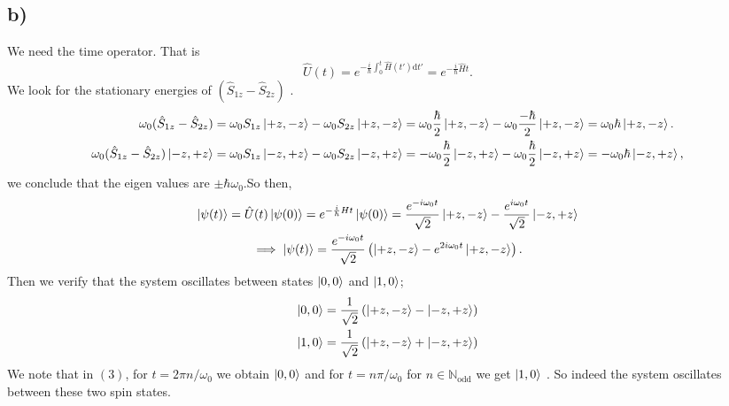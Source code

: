 \documentclass[12pt]{article}
\newcommand{\dr}{\mathrm{d}}
\theoremstyle{definition}
\theoremstyle{definition}
\theoremstyle{definition}
\theoremstyle{definition}
\theoremstyle{definition}
\theoremstyle{example}
\theoremstyle{note}
\theoremstyle{remark}
\theoremstyle{example}
\begin{document}
 				\subsection*{b) }
 					We need the time operator. That is
 					$$ \hat{U}(t) = e^{ - \frac{i}{\hbar} \int_{0}^{t} \hat{H} (t') \dr t' } = e^{-\frac{i}{\hbar} \hat{H} t}.$$
 					We look for the stationary energies of $(\hat{S}_{1z} - \hat{S}_{2z})$ . 
 					\begin{align*}
 						\omega_{0}(\hat{S}_{1z} - \hat{S}_{2z}) &= \omega_{0}S_{1z} \ket{+z, -z} - \omega_{0}S_{2z} \ket{+z, -z} = \omega_{0}\frac{\hbar}{2} \ket{+z, -z} - \omega_{0}\frac{-\hbar}{2} \ket{+z,-z} = \omega_{0}\hbar \ket{+z, -z}. \\
 						\omega_{0} (\hat{S}_{1z} - \hat{S}_{2z}) \ket{-z, +z} &= \omega_{0} S_{1z} \ket{-z,+z} - \omega_{0} S_{2z} \ket{-z,+z} = -\omega_{0} \frac{\hbar}{2} \ket{-z,+z} - \omega_{0 }\frac{\hbar}{2} \ket{-z, +z} = -\omega_{0} \hbar\ket{-z,+z},
 					\end{align*}
 					we conclude that the eigen values are $\pm \hbar \omega_{0}$.So then, 
 					\begin{gather}
 						 \ket{\psi(t)} = \hat{U}(t) \ket{\psi(0)} = e^{- \frac{i}{\hbar} H t} \ket{\psi(0)} = \frac{e^{-i \omega_{0} t} }{\sqrt{2}} \ket{+z, -z} - \frac{e^{i \omega_{0} t}}{\sqrt{2}} \ket{-z,+z} \nonumber \\
 						 \implies \ket{\psi(t)} = \frac{e^{-i \omega_{0} t}}{\sqrt{2}} \left(\ket{+z, -z} - e^{2i \omega_{0} t} \ket{+z, -z}\right).
 					\end{gather}
 					Then we verify that the system oscillates between states $\ket{0,0}$ and $\ket{1,0}$; 
 					\begin{align*}
 						 \ket{0,0} & = \frac{1}{\sqrt{2}} \left(\ket{+z,-z} - \ket{-z, +z}\right) \\
 						 \ket{1, 0 } &= \frac{1}{\sqrt{2}} \left(\ket{+z, -z } + \ket{-z, +z}\right)
 					\end{align*}
 					We note that in $(3)$, for $t = 2 \pi n / \omega_{0}$ we obtain $\ket{0,0}$ and for $t = n \pi / \omega_{0}$ for $n \in \mathbb{N}_{\text{odd}}$ we get $\ket{1,0}$ . So indeed the system oscillates between these two spin states.
\end{document}
